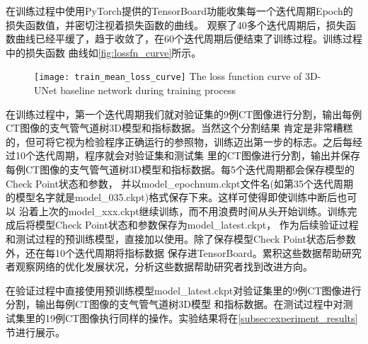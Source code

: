 在训练过程中使用PyTorch提供的TensorBoard功能收集每一个迭代周期Epoch的损失函数值，并密切注视着损失函数的曲线。
观察了40多个迭代周期后，损失函数曲线已经平缓了，趋于收敛了，在60个迭代周期后便结束了训练过程。训练过程中的损失函数
曲线如\autoref{fig:lossfn_curve}所示。
\begin{figure}[!htp]
    \centering
    \texttt{[image: train\_mean\_loss\_curve]}
        {The loss function curve of 3D-UNet baseline network during training process}
    \label{fig:lossfn_curve}
\end{figure}
在训练过程中，第一个迭代周期我们就对验证集的9例CT图像进行分割，输出每例CT图像的支气管气道树3D模型和指标数据。当然这个分割结果
肯定是非常糟糕的，但可将它视为检验程序正确运行的参照物，训练迈出第一步的标志。之后每经过10个迭代周期，程序就会对验证集和测试集
里的CT图像进行分割，输出并保存每例CT图像的支气管气道树3D模型和指标数据。每5个迭代周期都会保存模型的Check Point状态和参数，
并以model\_epochnum.ckpt文件名(如第35个迭代周期的模型名字就是model\_035.ckpt)格式保存下来。这样可使得即使训练中断后也可以
沿着上次的model\_xxx.ckpt继续训练，而不用浪费时间从头开始训练。训练完成后将模型Check Point状态和参数保存为model\_latest.ckpt，
作为后续验证过程和测试过程的预训练模型，直接加以使用。除了保存模型Check Point状态后参数外，还在每10个迭代周期将指标数据
保存进TensorBoard。累积这些数据帮助研究者观察网络的优化发展状况，分析这些数据帮助研究者找到改进方向。

在验证过程中直接使用预训练模型model\_latest.ckpt对验证集里的9例CT图像进行分割，输出每例CT图像的支气管气道树3D模型
和指标数据。在测试过程中对测试集里的19例CT图像执行同样的操作。实验结果将在\ref{subsec:experiment_results}节进行展示。

